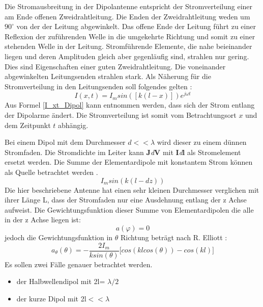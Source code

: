 Die Stromausbreitung in der Dipolantenne entspricht der Stromverteilung einer am Ende offenen Zweidrahtleitung. Die Enden der Zweidrahtleitung weden um $90^\circ$  von der der Leitung abgewinkelt. Das offene Ende der Leitung führt zu einer Reflexion der zuführenden Welle in die umgekehrte Richtung und somit zu einer stehenden Welle in der Leitung. Stromführende Elemente, die nahe beieinander liegen und deren Amplituden gleich aber gegenläufig sind, strahlen nur gering. Dies sind Eigenschaften einer guten Zweidrahtleitung. Die voneinander abgewinkelten Leitungsenden strahlen stark.
Als Näherung für die Stromverteilung in den Leitungsenden soll folgendes gelten \cite{elliott1981antenna}:
\begin{equation}\label{I_xt_Dipol} 
I(x,t) =I_{m}sin([k(l-x)])e^{j\omega t}
\end{equation}
Aus Formel \ref{I_xt_Dipol} kann entnommen werden, dass sich der Strom entlang der Dipolarme ändert. Die Stromverteilung ist somit vom Betrachtungsort $x$ und dem Zeitpunkt $t$ abhängig.


Bei einem Dipol mit dem Durchmesser $d<<\lambda$ wird dieser zu einem dünnen Stromfaden. Die Stromdichte im Leiter kann \textbf{J}\textit{d}\textbf{\textbf{V}} mit \textbf{I}\textit{d}\textbf{\textbf{l}} als Stromelement ersetzt werden. Die Summe der Elementardipole mit konstantem Strom können als Quelle betrachtet werden \cite{elliott1981antenna}.\\

\begin{equation}
I_{m}sin(k(l-dz))
\end{equation}
Die hier beschriebene Antenne hat einen sehr kleinen Durchmesser verglichen mit ihrer Länge L, dass der Stromfaden nur eine Ausdehnung entlang der z Achse aufweist. Die Gewichtungsfunktion dieser Summe von Elementardipolen die alle in der z Achse liegen ist:
\begin{equation}
a(\varphi)= 0
\end{equation}
jedoch die Gewichtungsfunktion in $\theta$ Richtung beträgt nach R. Elliott \cite{elliott1981antenna}:
\begin{equation}\label{eq:Gewichtungsfunktion}
a_{\theta}(\theta)=- \frac{2I_{m}}{k sin(\theta)} \lbrack cos(kl cos(\theta)) - cos(kl) \rbrack
\end{equation}
Es sollen zwei Fälle genauer betrachtet werden.
\begin{itemize}
\item der Halbwellendipol mit 2l= $\lambda/2$
\item der kurze Dipol mit 2l$<<\lambda$
\end{itemize}
